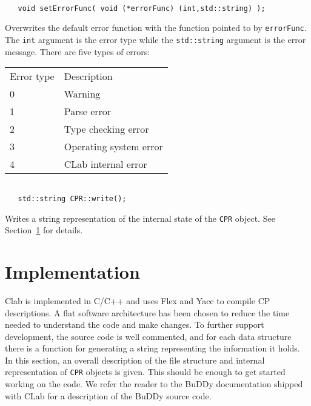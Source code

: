 \documentclass{article}
\begin{document}
\noindent
\hrulefill

\begin{verbatim}

   void setErrorFunc( void (*errorFunc) (int,std::string) );

\end{verbatim}
Overwrites the default error function with the function pointed
to by \texttt{errorFunc}. The \texttt{int} argument is the error
type while the \texttt{std::string} argument is the error message. 
There are five types of errors: 
\begin{center}
\begin{tabular}{lp{8.0cm}}
Error type & Description \\
0          & Warning \\
1          & Parse error \\
2          & Type checking error \\
3          & Operating system error \\
4          & CLab internal error \\
\end{tabular}
\end{center}

\noindent
\hrulefill

\begin{verbatim}

   std::string CPR::write();

\end{verbatim}
Writes a string representation of the internal state of the \texttt{CPR} object.
See Section~\ref{sec:impl} for details.


\section{Implementation}
\label{sec:impl}

Clab is implemented in C/C++ and uses Flex and Yacc to compile CP
descriptions.  A flat software architecture has been chosen to reduce
the time needed to understand the code and make changes. To further
support development, the source code is well commented, and for each
data structure there is a function for generating a string
representing the information it holds. In this section, an
overall description of the file structure and internal representation
of \texttt{CPR} objects is given. This should be enough to get started
working on the code. We refer the reader to the BuDDy documentation
shipped with CLab for a description of the BuDDy source code.
\end{document}

